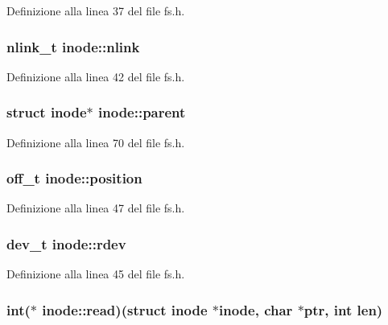 Definizione alla linea 37 del file fs.\+h.

\hypertarget{structinode_a1daedc820c86b5af32f0a137419f7a8f}{
\subsubsection[{nlink}]{\setlength{\rightskip}{0pt plus 5cm}nlink\+\_\+t inode\+::nlink}}\label{structinode_a1daedc820c86b5af32f0a137419f7a8f}


Definizione alla linea 42 del file fs.\+h.

\hypertarget{structinode_a2d4fac4ae14332628e6fa2bd55dd3121}{
\subsubsection[{parent}]{\setlength{\rightskip}{0pt plus 5cm}struct {\bf inode}$\ast$ inode\+::parent}}\label{structinode_a2d4fac4ae14332628e6fa2bd55dd3121}


Definizione alla linea 70 del file fs.\+h.

\hypertarget{structinode_a5756f61233e40d01652094d29b5daf6c}{
\subsubsection[{position}]{\setlength{\rightskip}{0pt plus 5cm}off\+\_\+t inode\+::position}}\label{structinode_a5756f61233e40d01652094d29b5daf6c}


Definizione alla linea 47 del file fs.\+h.

\hypertarget{structinode_a3e7613383954ff7b5faf7c2188e1f61b}{
\subsubsection[{rdev}]{\setlength{\rightskip}{0pt plus 5cm}dev\+\_\+t inode\+::rdev}}\label{structinode_a3e7613383954ff7b5faf7c2188e1f61b}


Definizione alla linea 45 del file fs.\+h.

\hypertarget{structinode_ae2c5e8a0a372334b97024fbd9ef694c1}{
\subsubsection[{read}]{\setlength{\rightskip}{0pt plus 5cm}int($\ast$ inode\+::read)(struct {\bf inode} $\ast${\bf inode}, char $\ast$ptr, int len)}}\label{structinode_ae2c5e8a0a372334b97024fbd9ef694c1}


